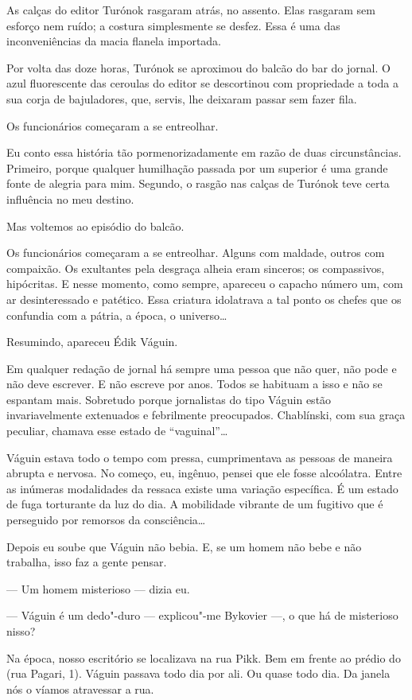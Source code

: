 As calças do editor Turónok rasgaram atrás, no assento. Elas rasgaram
sem esforço nem ruído; a costura simplesmente se desfez. Essa é uma das
inconveniências da macia flanela importada.

Por volta das doze horas, Turónok se aproximou do balcão do bar do
jornal. O azul fluorescente das ceroulas do editor se descortinou com
propriedade a toda a sua corja de bajuladores, que, servis, lhe deixaram
passar sem fazer fila.

Os funcionários começaram a se entreolhar.

Eu conto essa história tão pormenorizadamente em razão de duas
circunstâncias. Primeiro, porque qualquer humilhação passada por um
superior é uma grande fonte de alegria para mim. Segundo, o rasgão nas
calças de Turónok teve certa influência no meu destino.

Mas voltemos ao episódio do balcão.

Os funcionários começaram a se entreolhar. Alguns com maldade, outros
com compaixão. Os exultantes pela desgraça alheia eram sinceros; os
compassivos, hipócritas. E nesse momento, como sempre, apareceu o
capacho número um, com ar desinteressado e patético. Essa criatura
idolatrava a tal ponto os chefes que os confundia com a pátria, a época,
o universo\ldots{}

Resumindo, apareceu Édik Váguin.

Em qualquer redação de jornal há sempre uma pessoa que não quer, não
pode e não deve escrever. E não escreve por anos. Todos se habituam a
isso e não se espantam mais. Sobretudo porque jornalistas do tipo Váguin
estão invariavelmente extenuados e febrilmente preocupados. Chablínski,
com sua graça peculiar, chamava esse estado de ``vaguinal''\ldots{}

Váguin estava todo o tempo com pressa, cumprimentava as pessoas de
maneira abrupta e nervosa. No começo, eu, ingênuo, pensei que ele fosse
alcoólatra. Entre as inúmeras modalidades da ressaca existe uma variação
específica. É um estado de fuga torturante da luz do dia. A mobilidade
vibrante de um fugitivo que é perseguido por remorsos da consciência\ldots{}

Depois eu soube que Váguin não bebia. E, se um homem não bebe e não
trabalha, isso faz a gente pensar.

--- Um homem misterioso --- dizia eu.

--- Váguin é um dedo"-duro --- explicou"-me Bykovier
---, o que há de misterioso nisso?

Na época, nosso escritório se localizava na rua Pikk. Bem em frente ao
prédio do  (rua Pagari, 1). Váguin passava todo dia por ali. Ou quase
todo dia. Da janela nós o víamos atravessar a rua.

